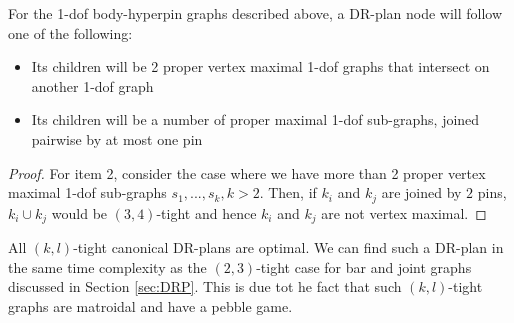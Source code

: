 \begin{observation}
    For the 1-dof body-hyperpin graphs described above, a DR-plan node will follow one of the following:

    \begin{itemize}
        \item Its children will be 2 proper vertex maximal 1-dof graphs that intersect on another 1-dof graph
        \item Its children will be a number of proper maximal 1-dof sub-graphs, joined pairwise by at most one pin
    \end{itemize}
\end{observation}

\begin{proof}

    For item 2, consider the case where we have more than 2 proper vertex maximal 1-dof sub-graphs $s_1, ..., s_k, k > 2$. Then, if $k_i$ and $k_j$ are joined by $2$ pins, $k_i \cup k_j$ would be $(3,4)$-tight and hence $k_i$ and $k_j$ are not vertex maximal.
\end{proof}

\begin{remark}\label{rem:1dofcanon}
    All $(k,l)$-tight canonical DR-plans are optimal. We can find such a DR-plan in the same time complexity as the $(2,3)$-tight case for bar and joint graphs discussed in Section \ref{sec:DRP}. This is due tot he fact that such $(k,l)$-tight graphs are matroidal and have a pebble game.
\end{remark}


